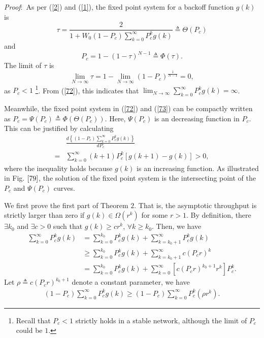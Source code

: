 \documentclass[journal]{IEEEtran}
\begin{document}
\emph{Proof}:\ As per (\ref{2}) and (\ref{1}), the fixed point system for a backoff function $g(k)$ is
\begin{equation}
\label{72}
\tau=\frac{2}{1+W_0\left(1-P_c\right)\sum_{k=0}^{\infty} P_c^kg(k)} \triangleq \Theta\left(P_c\right)
\end{equation}
and
\begin{equation}
\label{73}
P_c = 1- (1-\tau)^{N-1} \triangleq \Phi\left(\tau\right).
\end{equation}
The limit of $\tau$ is
\begin{equation}
\label{68}
\lim_{N\rightarrow\infty}\tau = 1 - \lim_{N\rightarrow \infty}\left(1-P_c\right)^{\frac{1}{N-1}} = 0,
\end{equation}
as $P_c<1$ \footnote{Recall that $P_c<1$ strictly holds in a stable network, although the limit of $P_c$ could be $1$.}. From (\ref{72}), this indicates that $\lim_{N\rightarrow \infty}\sum_{k=0}^{\infty} P_c^kg(k)= \infty$.

Meanwhile, the fixed point system in (\ref{72}) and (\ref{73}) can be compactly written as $P_c=\Psi\left(P_c\right) \triangleq \Phi\left(\Theta\left(P_c\right)\right)$. Here, $\Psi\left(P_c\right)$ is an decreasing function in $P_c$. This can be justified by calculating
\begin{equation}
\begin{aligned}
\label{67}
&\frac{d \left\{\left(1-P_c\right)\sum_{k=0}^{\infty} P_c^kg(k)\right\}}{d P_c} \\
=& \sum_{k=0}^{\infty} \left(k+1\right)P_c^k \left[g(k+1)-g(k)\right]>0,
\end{aligned}
\end{equation}
where the inequality holds because $g(k)$ is an increasing function. As illustrated in Fig. $\ref{79}$, the solution of the fixed point system is the intersecting point of the $P_c$ and $\Psi\left(P_c\right)$ curves.

We first prove the first part of Theorem $2$. That is, the asymptotic throughput is strictly larger than zero if $g(k)\in\Omega\left(r^k\right)$ for some $r>1$. By definition, there $\exists k_0$ and $\exists c>0$ such that $g(k)\geq c r^k$, $\forall k\geq k_0$. Then, we have
\begin{equation}
\begin{aligned}
\sum_{k=0}^{\infty} P_c^kg(k) &= \sum_{k=0}^{k_0} P_c^kg(k) + \sum_{k=k_0+1}^{\infty} P_c^kg(k)\\
&\geq \sum_{k=0}^{k_0} P_c^kg(k) + \sum_{k=k_0+1}^{\infty}c \left(P_c r\right)^k\\
&= \sum_{k=0}^{k_0} P_c^kg(k) + \sum_{k=0}^{\infty} \left[c\left(P_cr\right)^{k_0+1}r^k\right] P_c^k.
\end{aligned}
\end{equation}
Let $\rho \triangleq c\left(P_cr\right)^{k_0+1}$ denote a constant parameter, we have
\begin{equation}
\label{64}
\begin{aligned}
\left(1-P_c\right)\sum_{k=0}^{\infty} P_c^kg(k) \geq \left(1-P_c\right)\sum_{k=0}^{\infty} P_c^k \left(\rho r^k\right).
\end{aligned}
\end{equation}
\end{document}
